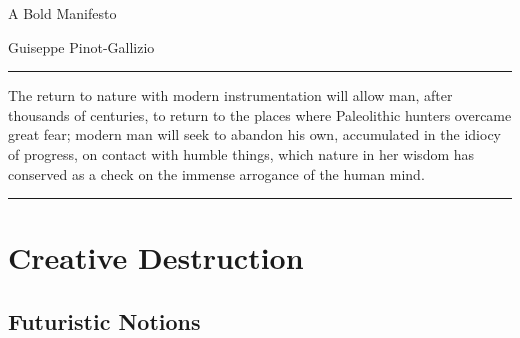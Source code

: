 \documentclass[letterpaper]{article}
\def\authors{Guiseppe Pinot-Gallizio}
\def\title{A Bold Manifesto}
\renewenvironment{abstract}
	{\noindent\rule{\textwidth}{0.1pt}
	\small
	\begin{center}{\bf\abstractname}\end{center}
	\quotation}
	{\\
  \bf\noindent\rule{\textwidth}{0.1pt}}
\begin{document}
\begin{center}
\huge \title

{\small \authors}
\end{center}

\begin{abstract}
The return to nature with modern instrumentation will allow man, after thousands of centuries, to return to the places where Paleolithic hunters overcame great fear; modern man will seek to abandon his own, accumulated in the idiocy of progress, on contact with humble things, which nature in her wisdom has conserved as a check on the immense arrogance of the human mind.
\end{abstract}



\section*{Creative Destruction}

\subsection*{Futuristic Notions}


\end{document}
